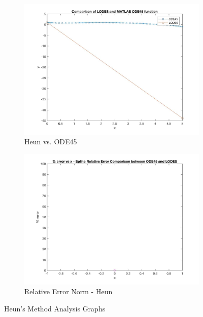 \documentclass[12pt, titlepage]{article}
\begin{document}
\begin{figure}[H]
\centering
\begin{subfigure}{.55\textwidth}
  \centering
  \includegraphics[width=\linewidth]{images/Test3/3LODESvsMATLABPlot.jpg}
  \caption{Heun vs. ODE45}
  \label{fig:heun3a}
\end{subfigure}%
\begin{subfigure}{.55\textwidth}
  \centering
  \includegraphics[width=\linewidth]{images/Test3/3RelativeErrorPlot.jpg}
  \caption{Relative Error Norm - Heun}
  \label{fig:heun3b}
\end{subfigure}
\caption{Heun's Method Analysis Graphs}
\label{fig:heun3}
\end{figure}
\end{document}
